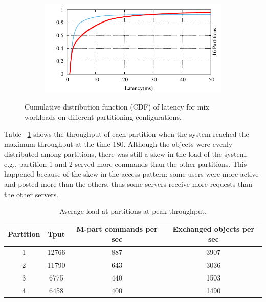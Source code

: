\begin{figure}[ht!]
\begin{subfigure}{0.48\columnwidth}
  \end{subfigure}
  \begin{subfigure}{0.48\columnwidth}
    \centering
    \includegraphics[width=\textwidth]{./figures/experiments/dynastar/chirper-latency-cdf-16p.pdf}
  \end{subfigure}
  \caption{Cumulative distribution function (CDF) of latency for mix workloads on different partitioning configurations.}
  \label{fig:dynastar-socialcdf}
\end{figure}


Table ~\ref{table:dynastar-socialsnapshot} shows the throughput of each
partition when the system reached the maximum throughput at the time 180.
Although the objects were evenly distributed among partitions, there was still a
skew in the load of the system, e.g., partition 1 and 2 served more commands
than the other partitions. This happened because of the skew in the access
pattern: some users were more active and posted more than the others,
thus some servers receive more requests than the other servers.

\begin{table}[htp]
\caption{Average load at partitions at peak throughput.}
\label{table:dynastar-socialsnapshot}
\begin{adjustbox}{max width=\columnwidth}
\vspace{10mm}
\begin{tabular}{|c|c|c|c|}
\hline
Partition & Tput & M-part commands per sec & Exchanged objects per sec \\ \hline
1         & 12766      & 887                      & 3907              \\ \hline
2         & 11790      & 643                      & 3036              \\ \hline
3         & 6775       & 440                      & 1503              \\ \hline
4         & 6458       & 400                      & 1490              \\ \hline
\end{tabular}
\vspace{10mm}
\end{adjustbox}
\end{table}


